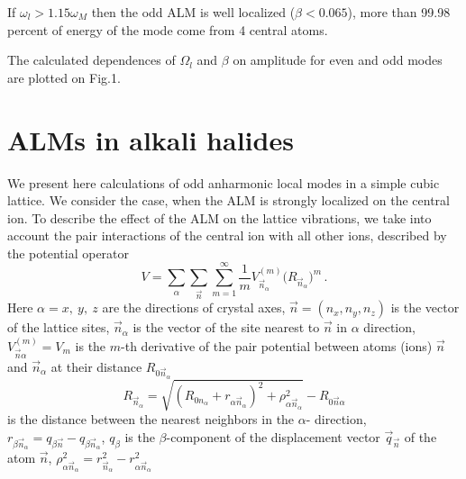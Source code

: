 If $\omega_l > 1.15 \omega_M$ then the odd ALM is well localized 
($\beta < 0.065$),  more than 99.98 percent of energy of the mode 
come from 4 central atoms. 

The calculated dependences of $\Omega_l$ and $\beta$ on amplitude
for even and odd modes are plotted on Fig.1.





\section{ALMs in alkali halides} 
We present here calculations of odd anharmonic local modes in a simple
cubic lattice. We consider the case, when the ALM is strongly localized 
on the central ion.  To describe  the effect of the ALM  on the lattice 
vibrations, we take into account the pair interactions of the
central ion with all other ions, described by the potential operator
\begin{equation} 
{V} = \sum_{\alpha}\sum_{\vec{n}}\sum_{m=1}^{\infty} \frac{1}{m} V^{(m)}_{ 
\vec{n}_{\alpha}} {\big (} {R}_{\vec{n}_{\alpha}} {\big )}^{m}\,. 
\end{equation} 
Here $\alpha = x,\:y,\:z$ are the directions of crystal axes,  
$\vec{n} = (n_{x},n_{y},n_{z})$ is the vector of the lattice sites, 
$\vec{n}_{\alpha}$ is the vector of the site nearest to $\vec{n}$ in $\alpha$ 
direction, $V^{(m)}_{\vec{n}\alpha} = V_m$ is the $m$-th derivative of the 
pair potential between atoms (ions) $\vec{n}$ and $\vec{n}_{\alpha}$ at their 
distance $R_{0\vec{n}_{\alpha}}$ 
\begin{equation} 
{R}_{\vec{n}_{\alpha}} = \sqrt{(R_{0 n_{\alpha}} + {r}_{\alpha   
\vec{n}_{\alpha}})^{2} 
+{\rho}_{\alpha \vec{n}_{\alpha}}^{2}} - R_{0\vec{n}\alpha} 
\end{equation} 
is the distance between the nearest neighbors in the $\alpha$- 
direction, ${r}_{\beta\vec{n}_\alpha}=q_{\beta\vec{n}}-q_{\beta  
\vec{n}_{\alpha}}$, $q_{\beta}$ is the $\beta$-component of the displacement  
vector $\vec{q}_{\vec{n}}$ of the atom $\vec{n}$,  
$\rho^{2}_{\alpha \vec{n}_{\alpha}}    
= r^{2}_{\vec{n}_{\alpha}} -
{r}_{\alpha \vec{n}_{\alpha}}^{2}$

